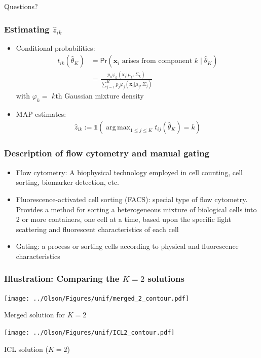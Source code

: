 \documentclass[mathserif,compress]{beamer}
\newcommand*\ba{\[ \begin{aligned}}
\newcommand*\ea{\end{aligned} \]}
\newcommand*\ind[1]{\mathbb{1}\left(#1\right)}
\newcommand*\estim[1]{\widehat{#1}}
\DeclareMathOperator*{\argmax}{arg\;max}
\renewcommand\;{\,}
\renewcommand\phi{\varphi}
\renewcommand\Pr[1]{ \mathsf{Pr}\left(#1\right) }
\newcommand{\bx}{\mathbf{x}}
\begin{document}
\begin{frame}
\begin{center}
\Large
Questions?
\end{center}
\end{frame}

\begin{frame}\frametitle{Estimating $\estim z_{ik}$}
\begin{itemize}
\item[]
Conditional probabilities:
\ba
t_{ik}\left(\estim\theta_K\right) & = \Pr{\bx_i \text{ arises from component $k$} \mid \estim\theta_K } \\
	& = \frac{ p_k \phi_k(\bx_i | \mu_k, \Sigma_k)  }
 	{ \sum_{j=1}^K p_j \phi_j(\bx_i | \mu_j, \Sigma_j) }
\ea
with $\phi_k = $ $k$th Gaussian mixture density
\medskip
\item[]
MAP estimates:
\ba
\estim z_{ik} := \ind{ \argmax_{1 \le j \le K} t_{ij}\left(\estim\theta_K\right) = k }
\ea
\end{itemize}
\end{frame}

\begin{frame}\frametitle{Description of flow cytometry and manual gating}
\begin{itemize}
\item
Flow cytometry:
A biophysical technology employed in cell counting, cell sorting, biomarker detection, etc.
\medskip
\item
Fluorescence-activated cell sorting (FACS): special type of flow cytometry. Provides a method for sorting a heterogeneous mixture of biological cells into 2 or more containers, one cell at a time, based upon the specific light scattering and fluorescent characteristics of each cell
\medskip
\item
Gating: a process or sorting cells according to physical and fluorescence characteristics
\end{itemize}
\end{frame}

\begin{frame}\frametitle{Illustration: Comparing the $K = 2$ solutions}
\begin{center}

\begin{minipage}{0.45\linewidth}
\texttt{[image: ../Olson/Figures/unif/merged\_2\_contour.pdf]}
\begin{center}
Merged solution for $K = 2$
\end{center}
\end{minipage}
\hfill
\begin{minipage}{0.45\linewidth}
\texttt{[image: ../Olson/Figures/unif/ICL2\_contour.pdf]}
\begin{center}
ICL solution ($K = 2$)
\end{center}
\end{minipage}
\end{center}
\end{frame}
\end{document}
